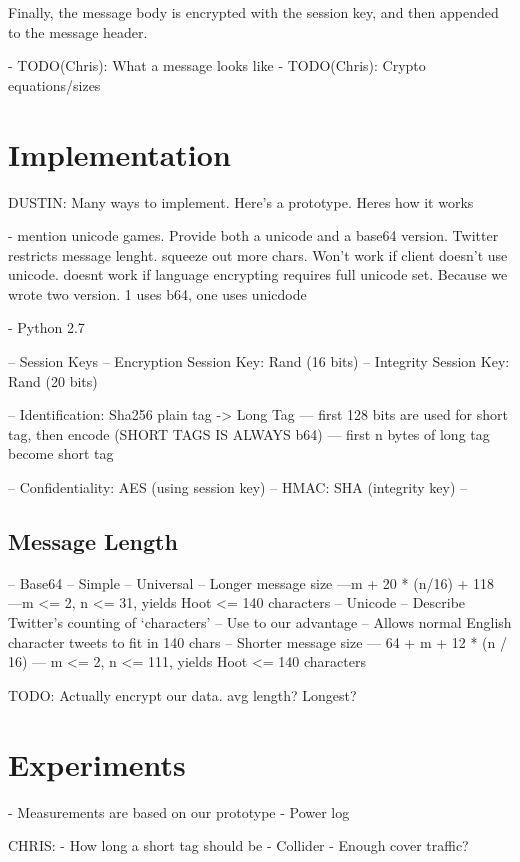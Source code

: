 \documentclass{acm_proc_article-sp}
\begin{document}
Finally, the message body is encrypted with the session key, and then appended to the message header.

- TODO(Chris): What a message looks like
- TODO(Chris): Crypto equations/sizes

\section{Implementation}

DUSTIN:
Many ways to implement. Here's a prototype. Heres how it works

- mention unicode games. Provide both a unicode and a base64 version. Twitter restricts message lenght. squeeze out more chars. Won't work if client doesn't use unicode. doesnt work if language encrypting requires full unicode set. Because we wrote two version. 1 uses b64, one uses unicdode

- Python 2.7

-- Session Keys
-- Encryption Session Key: Rand (16 bits)
-- Integrity Session Key: Rand (20 bits)

-- Identification: Sha256 plain tag -> Long Tag
--- first 128 bits are used for short tag, then encode (SHORT TAGS IS ALWAYS b64)
--- first n bytes of long tag become short tag

-- Confidentiality: AES (using session key)
-- HMAC: SHA (integrity key)
--

\subsection{Message Length}

-- Base64
	-- Simple
	-- Universal
	-- Longer message size 
		---m + 20 * (n/16) + 118 
		---m <= 2, n <= 31, yields Hoot <= 140 characters
-- Unicode
	-- Describe Twitter's counting of `characters'
	-- Use to our advantage
	-- Allows normal English character tweets to fit in 140 chars
	-- Shorter message size
	--- 64 + m + 12 * (n / 16)
	--- m <= 2, n <= 111, yields Hoot <= 140 characters
	
	TODO: Actually encrypt our data. avg length? Longest?

\section{Experiments}

- Measurements are based on our prototype
- Power log

CHRIS:
- How long a short tag should be
- Collider
- Enough cover traffic?
\end{document}
